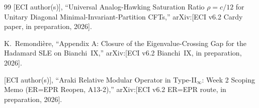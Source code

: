 \documentclass[12pt,a4paper]{article}
\begin{document}
\begin{thebibliography}{99}
[ECI author(s)],
``Universal Analog-Hawking Saturation Ratio $\rho = c/12$
for Unitary Diagonal Minimal-Invariant-Partition CFTs,''
arXiv:[ECI v6.2 Cardy paper, in preparation, 2026].

K.~Remondi\`{e}re,
``Appendix A: Closure of the Eigenvalue-Crossing Gap for the Hadamard SLE on Bianchi~IX,''
arXiv:[ECI v6.2 Bianchi~IX, in preparation, 2026].

[ECI author(s)],
``Araki Relative Modular Operator in Type-II$_\infty$: Week 2 Scoping Memo
(ER=EPR Reopen, A13-2),''
arXiv:[ECI v6.2 ER=EPR route, in preparation, 2026].

\end{thebibliography}
\end{document}
